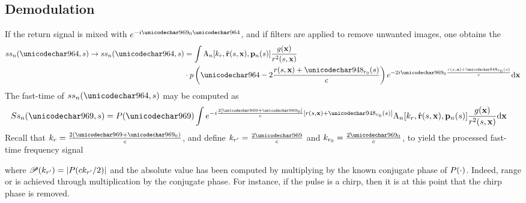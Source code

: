 \subsection{Demodulation}
If the return signal is mixed with $\eex{-\im\omega_0\fasttime}$, and if filters are applied to remove unwanted images, one obtains the 
\begin{equation}
\begin{split}
 \stst{\channelIndex}(\fasttime,\parm)\rightarrow \stst{\channelIndex}(\fasttime,\parm)&=\int\pattern{\channelIndex}[\kr, \uRangeVectorParm, \pAntennaParm{\channelIndex}]\frac{\reflectivity(\vct\target)}{\amplitude\range^2(\parm, \targetnoparm)}\\&\cdot\envelope\left(\fasttime-2\frac{\amplitude\range(\parm, \targetnoparm)+\rangeErrorZero(\parm)}{c}\right)
 \eex{-2\im\omega_0\frac{\amplitude\range(\parm, \targetnoparm)+\rangeErrorZero(\parm)}{c}}\d\vct\target
 \label{eq:fasttime1}
 \end{split}
\end{equation}
The fast-time  of $\stst{\channelIndex}(\fasttime,\parm)$ may be computed as
\begin{equation}
\begin{split}
 \Sfst{\channelIndex}(\omega,\parm) &= 	\Envelope(\omega)\int\eex{-\im\frac{2[\omega+\omega_0]}{c}[\amplitude\range(\parm, \targetnoparm)+\rangeErrorZero(\parm)]}\pattern{\channelIndex}[\kr, \uRangeVectorParm, \pAntennaParm{\channelIndex}]\frac{\reflectivity(\vct\target)}{\amplitude\range^2(\parm, \targetnoparm)}\d\vct\target
 \end{split}
\end{equation}
Recall that $\kr=\frac{2(\omega+\omega_0)}{c}$, and define $\krc = \frac{2\omega}{c}$ and $\krnaught = \frac{2\omega_0}{c}$, to yield the processed fast-time frequency signal
\begin{center}
\end{center}
where $\mathscr{P}(k_{r'}) = \lvert P(ck_{r'}/2)\rvert$ and the absolute value has been computed by multiplying by the known conjugate phase of $P(\cdot)$. Indeed, range or  is achieved through multiplication by the conjugate phase. For instance, if the pulse is a chirp, then it is at this point that the chirp phase is removed.
